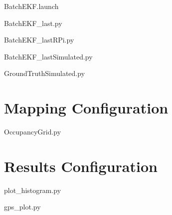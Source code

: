 BatchEKF.launch

BatchEKF\_last.py

BatchEKF\_lastRPi.py

BatchEKF\_lastSimulated.py

GroundTruthSimulated.py

\section{Mapping Configuration}
\noindent

OccupancyGrid.py

\section{Results Configuration}
\noindent

plot\_histogram.py

gps\_plot.py






